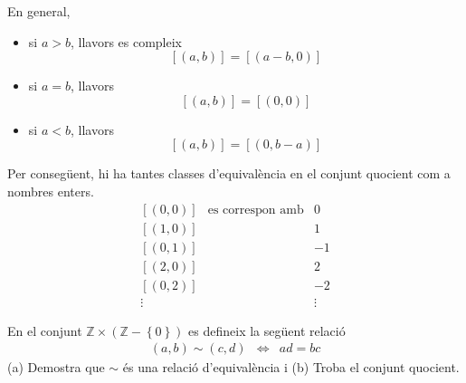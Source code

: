 \begin{solucio}
En general,

\begin{itemize}
\item si $a>b$, llavors es compleix%
\begin{equation*}
\left[ (a,b)\right] =\left[ (a-b,0)\right]
\end{equation*}

\item si $a=b$, llavors%
\begin{equation*}
\left[ (a,b)\right] =\left[ (0,0)\right]
\end{equation*}

\item si $a<b$, llavors%
\begin{equation*}
\left[ (a,b)\right] =\left[ (0,b-a)\right]
\end{equation*}
\end{itemize}

Per consegüent, hi ha tantes classes d'equivalència en el conjunt
quocient com a nombres enters.%
\begin{equation*}
\begin{array}{ccc}
\left[ (0,0)\right] & \text{es correspon amb} & 0 \\
\left[ (1,0)\right] &  & 1 \\
\left[ (0,1)\right] &  & -1 \\
\left[ (2,0)\right] &  & 2 \\
\left[ (0,2)\right] &  & -2 \\
\vdots &  & \vdots%
\end{array}%
\end{equation*}
\end{solucio}

\begin{exercici}
En el conjunt $\mathbb{Z}\times \left( \mathbb{Z}-\left\{ 0\right\} \right) $
es defineix la següent relació%
\begin{equation*}
\begin{array}{ccc}
(a,b)\sim (c,d) & \Longleftrightarrow & ad=bc%
\end{array}%
\end{equation*}%
(a) Demostra que $\sim $ és una relació d'equivalència i (b)
Troba el conjunt quocient.
\end{exercici}

